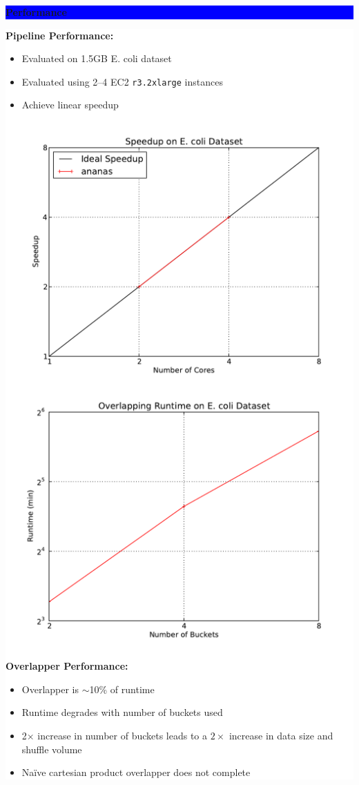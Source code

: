 \documentclass[11pt]{a0poster}
\begin{document}
{\begin{minipage}[t][2045pt][t]{\linewidth}
\begin{minipage}{0.3\linewidth}
\vspace{75pt}
\colorbox{Blue}{
\begin{minipage}{\linewidth}
\vspace{25pt}
\begin{center}
\Huge \bf \color{White} Performance
\end{center}
\vspace{10pt}
\end{minipage}
}
\colorbox{White}{
\begin{minipage}[t][1020pt][t]{\linewidth}
\color{Blue}
\vspace{20pt}
\LARGE
\textbf{Pipeline Performance:}
\begin{itemize}
\item Evaluated on 1.5GB E. coli dataset
\item Evaluated using 2--4 EC2 \texttt{r3.2xlarge} instances
\item Achieve linear speedup
\end{itemize}
\begin{center}
\includegraphics[width=0.45\linewidth]{graphs/speedup.pdf}
\includegraphics[width=0.45\linewidth]{graphs/overlap.pdf}
\end{center}
\textbf{Overlapper Performance:}
\begin{itemize}
\item Overlapper is $\sim$10\% of runtime
\item Runtime degrades with number of buckets used
\item 2$\times$ increase in number of buckets leads to a $2\times$ increase in data size and shuffle volume
\item Na\"{i}ve cartesian product overlapper does not complete
\end{itemize}
\pagebreak
\end{minipage}
}
\pagebreak
\end{minipage}
\begin{minipage}{0.03\linewidth}
\hfill
\pagebreak
\end{minipage}
\begin{minipage}{0.6\linewidth}


\end{minipage}
\end{minipage}}
\end{document}
